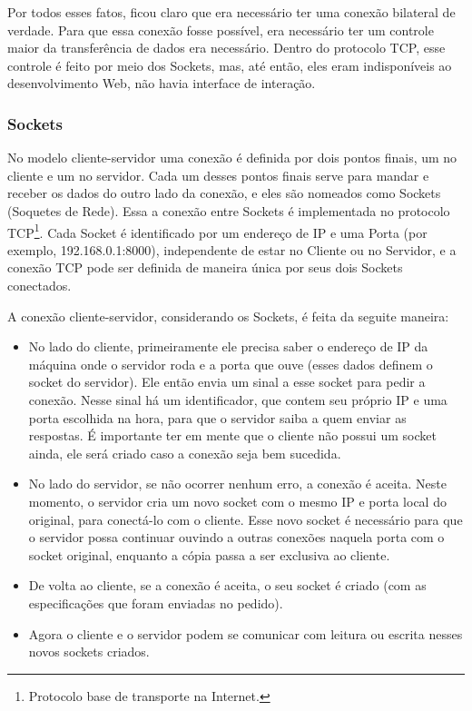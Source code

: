 \documentclass[a4paper,12pt]{article}
\begin{document}
Por todos esses fatos, ficou claro que era necessário ter uma conexão bilateral de verdade. Para que essa conexão fosse possível, era necessário ter um controle maior da transferência de dados era necessário. Dentro do protocolo TCP, esse controle é feito por meio dos Sockets, mas, até então, eles eram indisponíveis ao desenvolvimento Web, não havia interface de interação.


\subsubsection{Sockets}

No modelo cliente-servidor uma conexão é definida por dois pontos finais, um no cliente e um no servidor. Cada um desses pontos finais serve para mandar e receber os dados do outro lado da conexão, e eles são nomeados como Sockets (Soquetes de Rede). Essa a conexão entre Sockets é implementada no protocolo TCP\footnote{Protocolo base de transporte na Internet.}. Cada Socket é identificado por um endereço de IP e uma Porta (por exemplo, 192.168.0.1:8000), independente de estar no Cliente ou no Servidor, e a conexão TCP pode ser definida de maneira única por seus dois Sockets conectados.

A conexão cliente-servidor, considerando os Sockets, é feita da seguite maneira:

\begin{itemize}

    \item No lado do cliente, primeiramente ele precisa saber o endereço de IP da máquina onde o servidor roda e a porta que ouve (esses dados definem o socket do servidor). Ele então envia um sinal a esse socket para pedir a conexão. Nesse sinal há um identificador, que contem seu próprio IP e uma porta escolhida na hora, para que o servidor saiba a quem enviar as respostas. É importante ter em mente que o cliente não possui um socket ainda, ele será criado caso a conexão seja bem sucedida.

    \item No lado do servidor, se não ocorrer nenhum erro, a conexão é aceita. Neste momento, o servidor cria um novo socket com o mesmo IP e porta local do original, para conectá-lo com o cliente. Esse novo socket é necessário para que o servidor possa continuar ouvindo a outras conexões naquela porta com o socket original, enquanto a cópia passa a ser exclusiva ao cliente.

    \item De volta ao cliente, se a conexão é aceita, o seu socket é criado (com as especificações que foram enviadas no pedido).

    \item Agora o cliente e o servidor podem se comunicar com leitura ou escrita nesses novos sockets criados.
\end{itemize}
\end{document}
